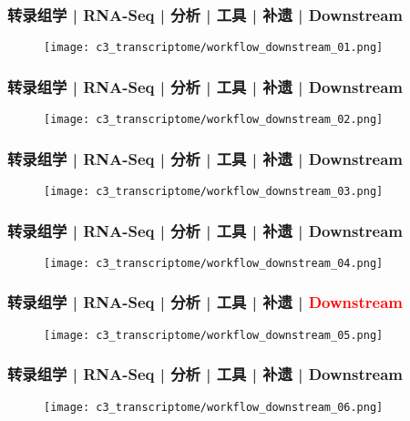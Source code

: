 \begin{frame}
  \frametitle{转录组学 | RNA-Seq | 分析 | 工具 | 补遗 | Downstream}
  \begin{figure}
    \centering
    \texttt{[image: c3\_transcriptome/workflow\_downstream\_01.png]}
  \end{figure}
\end{frame}

\begin{frame}
  \frametitle{转录组学 | RNA-Seq | 分析 | 工具 | 补遗 | Downstream}
  \begin{figure}
    \centering
    \texttt{[image: c3\_transcriptome/workflow\_downstream\_02.png]}
  \end{figure}
\end{frame}

\begin{frame}
  \frametitle{转录组学 | RNA-Seq | 分析 | 工具 | 补遗 | Downstream}
  \begin{figure}
    \centering
    \texttt{[image: c3\_transcriptome/workflow\_downstream\_03.png]}
  \end{figure}
\end{frame}

\begin{frame}
  \frametitle{转录组学 | RNA-Seq | 分析 | 工具 | 补遗 | Downstream}
  \begin{figure}
    \centering
    \texttt{[image: c3\_transcriptome/workflow\_downstream\_04.png]}
  \end{figure}
\end{frame}

\begin{frame}
  \frametitle{转录组学 | RNA-Seq | 分析 | 工具 | 补遗 | \textcolor{red}{Downstream}}
  \begin{figure}
    \centering
    \texttt{[image: c3\_transcriptome/workflow\_downstream\_05.png]}
  \end{figure}
\end{frame}

\begin{frame}
  \frametitle{转录组学 | RNA-Seq | 分析 | 工具 | 补遗 | Downstream}
  \begin{figure}
    \centering
    \texttt{[image: c3\_transcriptome/workflow\_downstream\_06.png]}
  \end{figure}
\end{frame}

